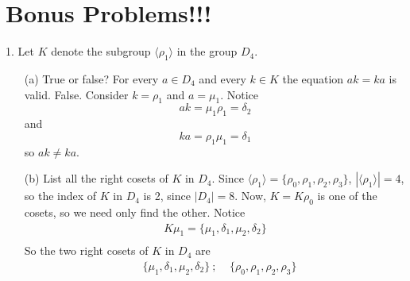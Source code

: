 \documentclass{article}
\begin{document}
\section*{Bonus Problems!!!}
1. Let $K$ denote the subgroup $\langle \rho_1 \rangle$ in the group $D_4$.
\begin{enumerate}
    \item[(a)] True or false? For every $a \in D_4$ and every $k \in K$ the equation $ak = ka$ is valid.
    \newline\newline
    False. Consider $k = \rho_1$ and $a = \mu_1$. Notice
    \[ak = \mu_1 \rho_1 = \delta_2\]
    and
    \[ka = \rho_1\mu_1 = \delta_1\]
    so $ak \neq ka$.
    
    \item[(b)] List all the right cosets of $K$ in $D_4$.
    \newline\newline
    Since $\langle \rho_1 \rangle = \{\rho_0, \rho_1, \rho_2, \rho_3\}$, $|\langle \rho_1 \rangle| = 4$, so the index of $K$ in $D_4$ is 2, since $|D_4| = 8$. Now, $K = K\rho_0$ is one of the cosets, so we need only find the other. Notice
    \begin{align*}
        K\mu_1 = \{\mu_1, \delta_1, \mu_2, \delta_2\} \\
    \end{align*}
    So the two right cosets of $K$ in $D_4$ are 
    \begin{align*}
        &\{\mu_1, \delta_1, \mu_2, \delta_2\} \: ; \:\:\:\:\: \{\rho_0, \rho_1, \rho_2, \rho_3\} \\
    \end{align*}
    

\end{enumerate}
\end{document}
